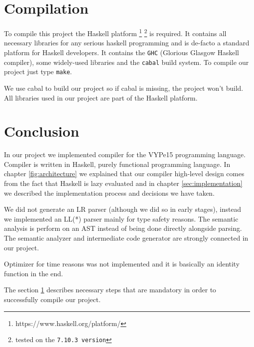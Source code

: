 \documentclass[titlepage]{article}
\begin{document}
\section{Compilation}
\label{sec:compilation}
To compile this project the Haskell platform \footnote{https://www.haskell.org/platform/}
\footnote{tested on the \texttt{7.10.3 version}}
is required. It contains all necessary libraries for any serious haskell programming
and is de-facto a standard platform for Haskell developers. It contains the \texttt{GHC}
(Glorious Glasgow
Haskell compiler), some widely-used libraries and the \texttt{cabal} build system.
To compile our project just type \texttt{make}.

We use cabal to build our project so if cabal is missing, the project won't build.
All libraries used in our project are part of the Haskell platform.

\section{Conclusion}
In our project we implemented compiler for the VYPe15 programming language. Compiler
is written in Haskell, purely functional programming language. In chapter
\ref{fig:architecture} we explained that our compiler high-level design comes from the
fact
that Haskell is lazy evaluated and in chapter \ref{sec:implementation} we described the
implementation process and decisions we have taken.

We did not generate an LR parser (although we did so in early stages), instead we
implemented an LL(*) parser mainly for type safety reasons. The semantic analysis is
perform on an AST instead of being done directly alongside parsing. The semantic analyzer
and intermediate code generator are strongly connected in our project.

Optimizer for time reasons was not implemented and it is basically an identity
function in the end.

The section \ref{sec:compilation} describes necessary steps that are mandatory in order
to successfully compile our project.

\newpage


\end{document}
